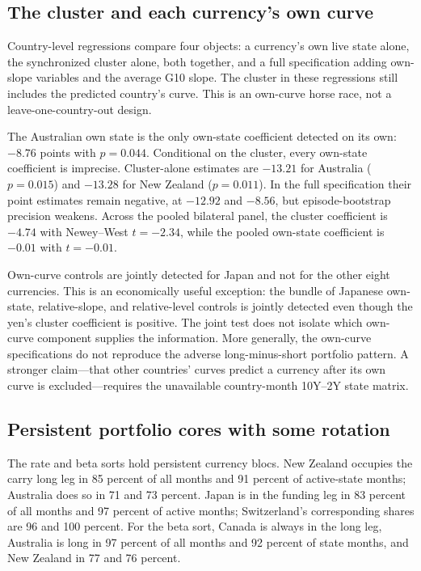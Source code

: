 \subsection{The cluster and each currency's own curve}

Country-level regressions compare four objects: a currency's own live state alone, the synchronized cluster alone, both together, and a full specification adding own-slope variables and the average G10 slope. The cluster in these regressions still includes the predicted country's curve. This is an own-curve horse race, not a leave-one-country-out design.

The Australian own state is the only own-state coefficient detected on its own: $-8.76$ points with $p=0.044$. Conditional on the cluster, every own-state coefficient is imprecise. Cluster-alone estimates are $-13.21$ for Australia ($p=0.015$) and $-13.28$ for New Zealand ($p=0.011$). In the full specification their point estimates remain negative, at $-12.92$ and $-8.56$, but episode-bootstrap precision weakens. Across the pooled bilateral panel, the cluster coefficient is $-4.74$ with Newey--West $t=-2.34$, while the pooled own-state coefficient is $-0.01$ with $t=-0.01$.

Own-curve controls are jointly detected for Japan and not for the other eight currencies. This is an economically useful exception: the bundle of Japanese own-state, relative-slope, and relative-level controls is jointly detected even though the yen's cluster coefficient is positive. The joint test does not isolate which own-curve component supplies the information. More generally, the own-curve specifications do not reproduce the adverse long-minus-short portfolio pattern. A stronger claim—that other countries' curves predict a currency after its own curve is excluded—requires the unavailable country-month 10Y--2Y state matrix.

\subsection{Persistent portfolio cores with some rotation}

The rate and beta sorts hold persistent currency blocs. New Zealand occupies the carry long leg in 85 percent of all months and 91 percent of active-state months; Australia does so in 71 and 73 percent. Japan is in the funding leg in 83 percent of all months and 97 percent of active months; Switzerland's corresponding shares are 96 and 100 percent. For the beta sort, Canada is always in the long leg, Australia is long in 97 percent of all months and 92 percent of state months, and New Zealand in 77 and 76 percent.

